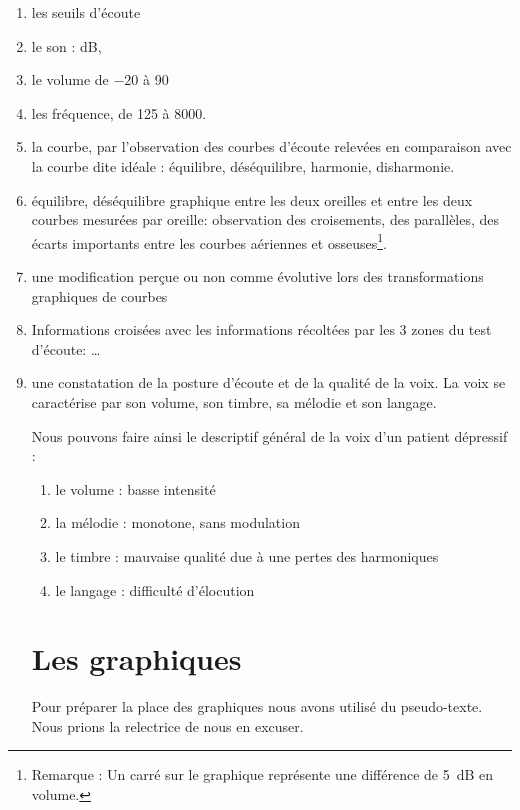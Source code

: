   \begin{enumerate}
 	\item les seuils d'écoute
 	\item le son : dB, 
 	\item le volume de $-20$ à 90 %
 	\item les fréquence, de 125 à 8000.   \label{chapitre 6.2t} %
 	\item la courbe, par l'observation des courbes d'écoute relevées
 	en comparaison avec la courbe dite idéale : équilibre,
 	déséquilibre, harmonie, disharmonie.  
 	\item équilibre, déséquilibre graphique entre les deux oreilles et entre les deux courbes mesurées par oreille: observation des croisements, des parallèles, des
 	écarts importants entre les courbes aériennes et osseuses\footnote{Remarque :
 		Un carré sur le graphique représente une différence de \SI{5}{\dB} en
 		volume.}.
 	\item une modification perçue ou non comme évolutive lors des transformations graphiques de courbes
 	\item  Informations croisées avec les informations récoltées   par les 3 
 	zones du test d'écoute: \ldots{}
 	\item une constatation de la posture d'écoute et de la qualité de
 	la voix. La voix se caractérise par son volume, son timbre, sa mélodie et son langage. 
 	
 	
 Nous pouvons faire ainsi le descriptif général de la voix d'un patient dépressif :
 	\begin{enumerate}
 		\item le volume : basse intensité
 		\item la mélodie : monotone, sans modulation
 		\item le timbre : mauvaise qualité due à une pertes des harmoniques
 		\item le langage : difficulté d'élocution
 	\end{enumerate}
 	
 		
 	
 	
 	
 	\section{Les graphiques}
 	
 	Pour préparer la place des graphiques nous avons 
 	utilisé du pseudo-texte. Nous prions la relectrice de nous en excuser.
 	

\end{enumerate}
